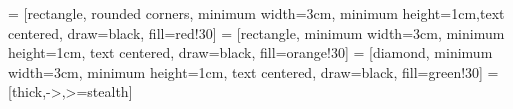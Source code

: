 \usepackage{tikz}
\usepackage{pgfplots}
\usepackage{pgf-pie}
\pgfplotsset{compat=1.18}
\usetikzlibrary{shapes.geometric, arrows, positioning, calc, shapes}
 = [rectangle, rounded corners, minimum width=3cm, minimum height=1cm,text centered, draw=black, fill=red!30]
 = [rectangle, minimum width=3cm, minimum height=1cm, text centered, draw=black, fill=orange!30]
 = [diamond, minimum width=3cm, minimum height=1cm, text centered, draw=black, fill=green!30]
 = [thick,->,>=stealth]

\usepackage{ifthen}



\newcommand{\figref}[1]{gambar~\ref{#1}}
\newcommand{\Figref}[1]{Gambar~\ref{#1}}
\newcommand{\tabref}[1]{tabel~\ref{#1}}
\newcommand{\Tabref}[1]{Tabel~\ref{#1}}
\newcommand{\equref}[1]{persamaan~(\ref{#1})}
\newcommand{\Equref}[1]{Persamaan~(\ref{#1})}
\newcommand{\lstref}[1]{kode~\ref{#1}}
\newcommand{\Lstref}[1]{Kode~\ref{#1}}


